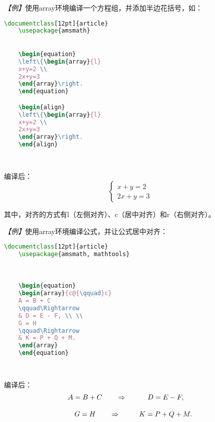 \emph{【例】}使用array环境编译一个方程组，并添加半边花括号，如：
\begin{lstlisting}[language=TeX]
    \documentclass[12pt]{article}
    \usepackage{amsmath}
    

    \begin{equation}
    \left\{\begin{array}{l}
    x+y=2 \\
    2x+y=3
    \end{array}\right.
    \end{equation}

    \begin{align}
    \left\{\begin{array}{l}
    x+y=2 \\
    2x+y=3
    \end{array}\right.
    \end{align}

    
\end{lstlisting}

编译后：
\begin{equation}
    \left\{\begin{array}{l}
        x+y=2 \\
        2x+y=3
    \end{array}\right.
\end{equation}

其中，对齐的方式有l（左侧对齐）、c（居中对齐）和r（右侧对齐）。

\emph{【例】}使用array环境编译公式，并让公式居中对齐：
\begin{lstlisting}[language=TeX]
    \documentclass[12pt]{article}
    \usepackage{amsmath, mathtools}

    

    \begin{equation}
    \begin{array}{c@{\qquad}c}
    A = B + C
    \qquad\Rightarrow
    & D = E - F, \\ \\
    G = H
    \qquad\Rightarrow
    & K = P + Q + M.
    \end{array}
    \end{equation}

    
\end{lstlisting}

编译后：
\begin{equation}
    \begin{array}{c@{\qquad}c}
        A = B + C
        \qquad\Rightarrow
         & D = E - F,     \\ \\
        G = H
        \qquad\Rightarrow
         & K = P + Q + M.
    \end{array}
\end{equation}

